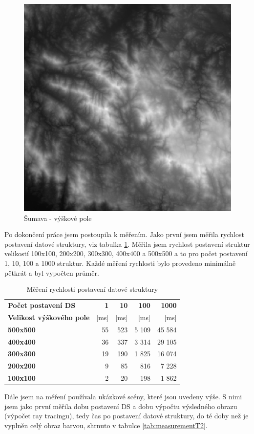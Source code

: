 \documentclass[report,11pt]{elsarticle}
\begin{document}
\begin{figure}[h]
\hfill\includegraphics[width=0.4\linewidth]{Sumava.png}\hspace*{\fill}
\caption{Šumava - výškové pole}
\label{fig:sumHm}
\end{figure}

Po dokončení práce jsem postoupila k měřením. Jako první jsem měřila rychlost postavení datové struktury, viz tabulka \ref{tab:measurementT1}. Měřila jsem rychlost postavení struktur velikostí 100x100, 200x200, 300x300, 400x400 a 500x500 a to pro počet postavení 1, 10, 100 a 1000 struktur. Každé měření rychlosti bylo provedeno minimálně pětkrát a byl vypočten průměr.

\begin{table}
\begin{tabular}{| l || r | r | r | r |}
\hline\bfseries Počet postavení DS & \bfseries 1 & \bfseries 10 & \bfseries 100 & \bfseries 1000 \\
\bfseries Velikost výškového pole & [ms] & [ms] & [ms] & [ms] \\ \hline
\bfseries 500x500 & 55 & 523 & 5 109 & 45 584 \\ \hline
\bfseries 400x400 & 36 & 337 & 3 314 & 29 105 \\ \hline
\bfseries 300x300 & 19 & 190 & 1 825 & 16 074 \\ \hline
\bfseries 200x200 & 9 & 85 & 816 & 7 228 \\ \hline
\bfseries 100x100 & 2 & 20 & 198 & 1 862 \\ \hline
\end{tabular}
\caption{Měření rychlosti postavení datové struktury}
\label{tab:measurementT1}
\end{table}

Dále jsem na měření používala ukázkové scény, které jsou uvedeny výše. S nimi jsem jako první měřila dobu postavení DS a dobu výpočtu výsledného obrazu (výpočet ray tracingu), tedy čas po postavení datové struktury, do té doby než je vyplněn celý obraz barvou, shrnuto v tabulce \ref{tab:measurementT2}.
\end{document}
